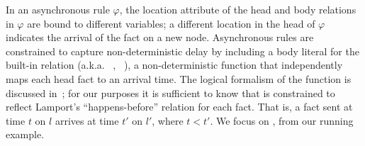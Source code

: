 In an asynchronous rule $\varphi$,
the location attribute of the head and body relations in $\varphi$ are bound to different variables; a different location in the head of $\varphi$ indicates the arrival of the fact on a new node.
Asynchronous rules are constrained to capture non-deterministic delay by including a body literal for the built-in  relation (a.k.a. ~\cite{dedalus}, ~\cite{dedalusSemantics}), a non-deterministic function that independently maps each  head fact to an arrival time. 
The logical formalism of the  function is discussed in~\cite{dedalusSemantics}; for our purposes it is sufficient to know that  is constrained to reflect Lamport's ``happens-before'' relation for each fact. That is, a fact sent at time $t$ on $l$ arrives at time $t'$ on $l'$, where $t < t'$.
We focus on 
,  from our running example.
